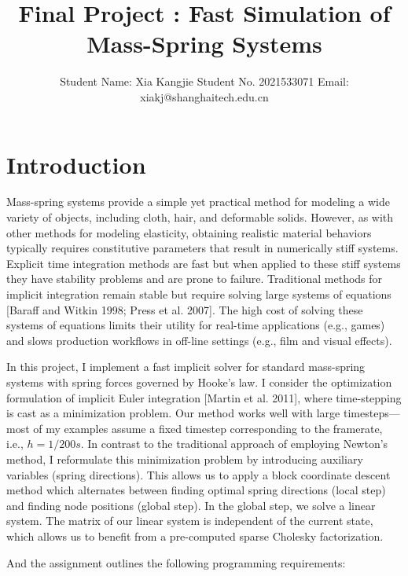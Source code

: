 \documentclass[acmtog]{acmart}
\title{Final Project : Fast Simulation of Mass-Spring Systems}
\author{Student Name: Xia Kangjie \quad Student No. 2021533071 \quad Email: xiakj@shanghaitech.edu.cn}
\begin{document}
\maketitle

\vspace*{2 ex}


\section{Introduction}
Mass-spring systems provide a simple yet practical method for modeling a wide variety of objects, including cloth, hair, and deformable solids. However, as with other methods for modeling elasticity, obtaining realistic material behaviors typically requires constitutive parameters that result in numerically stiff systems. Explicit time integration methods are fast but when applied to these stiff systems they have stability problems and are prone to failure. Traditional methods for implicit integration remain stable but require solving large systems of equations [Baraff and Witkin 1998; Press et al. 2007]. The high cost of solving these systems of equations limits their utility for real-time applications (e.g., games) and slows production workflows in off-line settings (e.g., film and visual effects).

In this project, I implement a fast implicit solver for standard mass-spring systems with spring forces governed by Hooke’s law. I consider the optimization formulation of implicit Euler integration [Martin et al. 2011], where time-stepping is cast as a minimization problem. Our method works well with large timesteps—most of my examples assume a fixed timestep corresponding to the framerate, i.e., $h = 1/200s$. In contrast to the traditional approach of employing Newton’s method, I reformulate this minimization problem by introducing auxiliary variables (spring directions). This allows us to apply a block coordinate descent method which alternates between finding optimal spring directions (local step) and finding node positions (global step). In the global step, we solve a linear system. The matrix of our linear system is independent of the current state, which allows us to benefit from a pre-computed sparse Cholesky factorization.

And the assignment outlines the following programming requirements:
\end{document}
